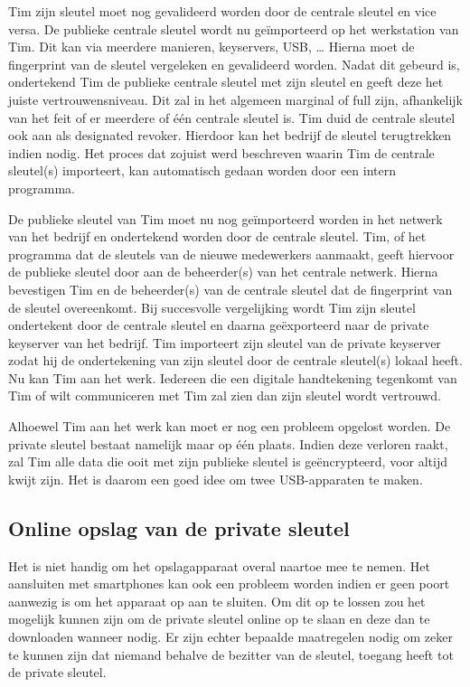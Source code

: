 Tim zijn sleutel moet nog gevalideerd worden door de centrale sleutel en vice
versa. De publieke centrale sleutel wordt nu geïmporteerd op het werkstation van
Tim. Dit kan via meerdere manieren, keyservers, USB, … Hierna moet de
fingerprint van de sleutel vergeleken en gevalideerd worden. Nadat dit gebeurd
is, ondertekend Tim de publieke centrale sleutel met zijn sleutel en geeft deze
het juiste vertrouwensniveau. Dit zal in het algemeen marginal of full zijn,
afhankelijk van het feit of er meerdere of één centrale sleutel is. Tim duid de
centrale sleutel ook aan als designated revoker. Hierdoor kan het bedrijf de
sleutel terugtrekken indien nodig. Het proces dat zojuist werd beschreven waarin
Tim de centrale sleutel(s) importeert, kan automatisch gedaan worden door een
intern programma.

De publieke sleutel van Tim moet nu nog geïmporteerd worden in het netwerk van
het bedrijf en ondertekend worden door de centrale sleutel. Tim, of het
programma dat de sleutels van de nieuwe medewerkers aanmaakt, geeft hiervoor de
publieke sleutel door aan de beheerder(s) van het centrale netwerk. Hierna
bevestigen Tim en de beheerder(s) van de centrale sleutel dat de fingerprint van
de sleutel overeenkomt. Bij succesvolle vergelijking wordt Tim zijn sleutel
ondertekent door de centrale sleutel en daarna geëxporteerd naar de private
keyserver van het bedrijf. Tim importeert zijn sleutel van de private keyserver
zodat hij de ondertekening van zijn sleutel door de centrale sleutel(s) lokaal
heeft. Nu kan Tim aan het werk. Iedereen die een digitale handtekening tegenkomt
van Tim of wilt communiceren met Tim zal zien dan zijn sleutel wordt vertrouwd.

Alhoewel Tim aan het werk kan moet er nog een probleem opgelost worden. De
private sleutel bestaat namelijk maar op één plaats. Indien deze verloren raakt,
zal Tim alle data die ooit met zijn publieke sleutel is geëncrypteerd, voor
altijd kwijt zijn. Het is daarom een goed idee om twee USB-apparaten te maken.

\subsection{Online opslag van de private sleutel}
\label{subsec:online-opslag-van-de-private-sleutel}

Het is niet handig om het opslagapparaat overal naartoe mee te nemen. Het
aansluiten met smartphones kan ook een probleem worden indien er geen poort
aanwezig is om het apparaat op aan te sluiten. Om dit op te lossen zou het
mogelijk kunnen zijn om de private sleutel online op te slaan en deze dan te
downloaden wanneer nodig. Er zijn echter bepaalde maatregelen nodig om zeker te
kunnen zijn dat niemand behalve de bezitter van de sleutel, toegang heeft tot de
private sleutel.

